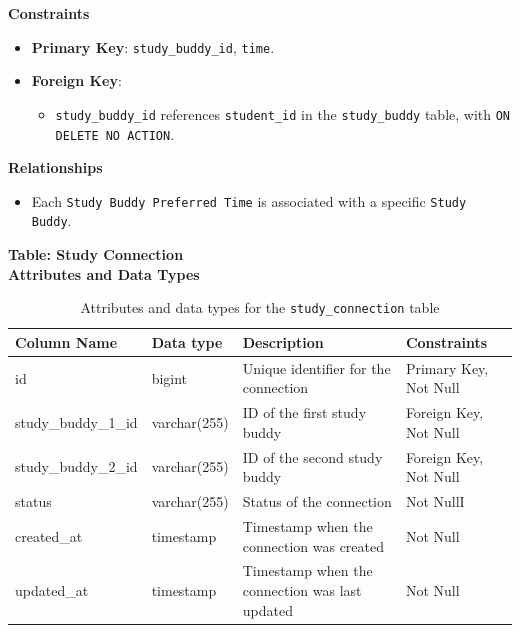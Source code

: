 \documentclass[12pt]{article}
\begin{document}
    \noindent 
    \textbf{Constraints} 
    \begin{itemize} 
        \item \textbf{Primary Key}: \texttt{study\_buddy\_id}, \texttt{time}. 
        \item \textbf{Foreign Key}: \begin{itemize} \item \texttt{study\_buddy\_id} references \texttt{student\_id} in the \texttt{study\_buddy} table, with \texttt{ON DELETE NO ACTION}. 
        \end{itemize} 
    \end{itemize}

    \noindent 
    \textbf{Relationships} 
    \begin{itemize} 
        \item Each \texttt{Study Buddy Preferred Time} is associated with a specific \texttt{Study Buddy}. 
    \end{itemize} 

    \textbf{Table: Study Connection} \\

    \textbf{Attributes and Data Types}
    \begin{table}[H] 
        \centering 
        \renewcommand{\arraystretch}{1.5} 
        \begin{tabular}{|l|l|p{4.5cm}|l|} 
        \hline 
        \rowcolor[HTML]{96FFFB} 
        \textbf{Column Name} & \textbf{Data type} & \textbf{Description} & \textbf{Constraints} \\ \hline 
        id & bigint & Unique identifier for the connection & Primary Key, Not Null \\ \hline 
        study\_buddy\_1\_id & varchar(255) & ID of the first study buddy & Foreign Key, Not Null \\ \hline 
        study\_buddy\_2\_id & varchar(255) & ID of the second study buddy & Foreign Key, Not Null \\ \hline 
        status & varchar(255) & Status of the connection & Not NullI \\ \hline 
        created\_at & timestamp & Timestamp when the connection was created & Not Null \\ \hline 
        updated\_at & timestamp & Timestamp when the connection was last updated & Not Null \\ \hline 
        \end{tabular} 
        \caption{Attributes and data types for the \texttt{study\_connection} table} 
    \end{table}
\end{document}
